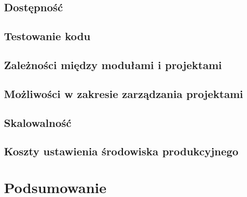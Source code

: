 \documentclass{SGGW-thesis}
\begin{document}
  \section{Dostępność}
  \section{Testowanie kodu}
  \section{Zależności między modułami i projektami}
  \section{Możliwości w zakresie zarządzania projektami}
  \section{Skalowalność}
  \section{Koszty ustawienia środowiska produkcyjnego}

\chapter{Podsumowanie}

\printbibliography[heading=bibnumbered,title={Bibliografia}]



\beforelastpage
\end{document}
